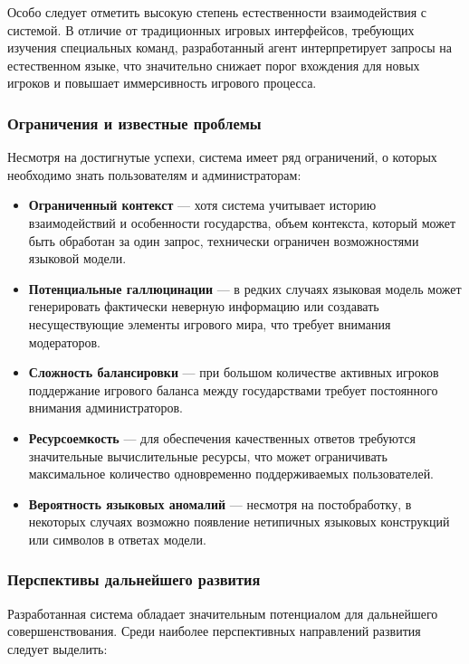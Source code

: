 Особо следует отметить высокую степень естественности взаимодействия с системой. В отличие от традиционных игровых интерфейсов, требующих изучения специальных команд, разработанный агент интерпретирует запросы на естественном языке, что значительно снижает порог вхождения для новых игроков и повышает иммерсивность игрового процесса.

\subsubsection{Ограничения и известные проблемы}

Несмотря на достигнутые успехи, система имеет ряд ограничений, о которых необходимо знать пользователям и администраторам:

\begin{itemize}
\item \textbf{Ограниченный контекст} — хотя система учитывает историю взаимодействий и особенности государства, объем контекста, который может быть обработан за один запрос, технически ограничен возможностями языковой модели.

\item \textbf{Потенциальные галлюцинации} — в редких случаях языковая модель может генерировать фактически неверную информацию или создавать несуществующие элементы игрового мира, что требует внимания модераторов.

\item \textbf{Сложность балансировки} — при большом количестве активных игроков поддержание игрового баланса между государствами требует постоянного внимания администраторов.

\item \textbf{Ресурсоемкость} — для обеспечения качественных ответов требуются значительные вычислительные ресурсы, что может ограничивать максимальное количество одновременно поддерживаемых пользователей.

\item \textbf{Вероятность языковых аномалий} — несмотря на постобработку, в некоторых случаях возможно появление нетипичных языковых конструкций или символов в ответах модели.
\end{itemize}

\subsubsection{Перспективы дальнейшего развития}

Разработанная система обладает значительным потенциалом для дальнейшего совершенствования. Среди наиболее перспективных направлений развития следует выделить:

